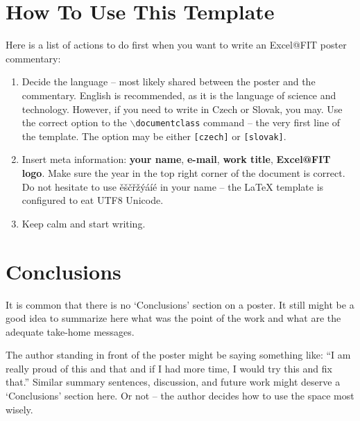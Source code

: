\documentclass{ExcelAtFIT}
\begin{document}
\section{How To Use This Template}
\label{sec:HowToUse}

Here is a list of actions to do first when you want to write an Excel@FIT poster commentary:
\begin{enumerate}
	\item Decide the language -- most likely shared between the poster and the commentary.  English is recommended, as it is the language of science and technology.  However, if you need to write in Czech or Slovak, you may.  Use the correct option to the \texttt{$\backslash$documentclass} command -- the very first line of the template.  The option may be either \texttt{[czech]} or \texttt{[slovak]}.
	\item Insert meta information: \textbf{your name}, \textbf{e-mail}, \textbf{work title}, \textbf{Excel@FIT logo}.  Make sure the year in the top right corner of the document is correct.  Do not hesitate to use ěščřžýáíé in your name -- the \LaTeX{} template is configured to eat UTF8 Unicode.
	\item Keep calm and start writing.
\end{enumerate}


\section{Conclusions}
\label{sec:Conclusions}

It is common that there is no `Conclusions' section on a poster.  It still might be a good idea to summarize here what was the point of the work and what are the adequate take-home messages.

The author standing in front of the poster might be saying something like: ``I am really proud of this and that and if I had more time, I would try this and fix that.''  Similar summary sentences, discussion, and future work might deserve a `Conclusions' section here. Or not -- the author decides how to use the space most wisely.
\end{document}
